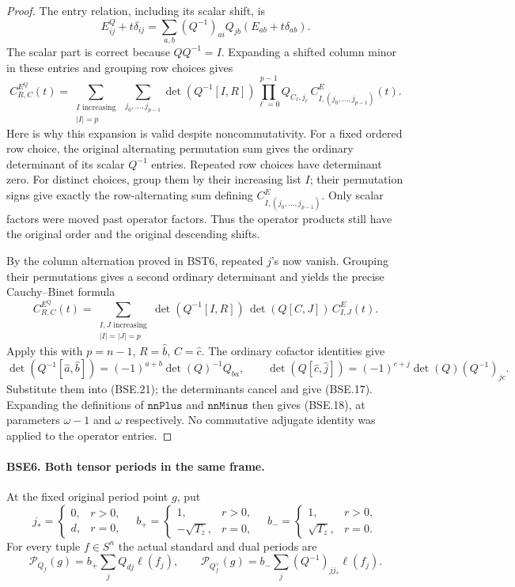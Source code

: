 \begin{proof}
The entry relation, including its scalar shift, is
\[
 E^Q_{ij}+t\delta_{ij}
    =\sum_{a,b}(Q^{-1})_{ai}Q_{jb}
                                      (E_{ab}+t\delta_{ab}).
 \tag{BSE.19}
\]
The scalar part is correct because $QQ^{-1}=I$.
Expanding a shifted column minor in these entries and grouping
row choices gives
\[
 C^{E^Q}_{R,C}(t)
 =\sum_{\substack{I\text{ increasing}\\ |I|=p}}
   \ \sum_{j_0,\ldots,j_{p-1}}
       \det(Q^{-1}[I,R])
       \prod_{\ell=0}^{p-1}Q_{C_\ell,j_\ell}\,
                             C^E_{I,(j_0,\ldots,j_{p-1})}(t).
 \tag{BSE.20}
\]
Here is why this expansion is valid despite noncommutativity.
For a fixed ordered row choice, the original alternating
permutation sum gives the ordinary determinant of its scalar
$Q^{-1}$ entries.  Repeated row choices have determinant zero.
For distinct choices, group them by their increasing list $I$;
their permutation signs give exactly the row-alternating sum
defining $C^E_{I,(j_0,\ldots,j_{p-1})}$.
Only scalar factors were moved past operator factors.
Thus the operator products still have the original order and
the original descending shifts.

By the column alternation proved in BST6, repeated $j$'s now
vanish.  Grouping their permutations gives a second ordinary
determinant and yields the precise Cauchy--Binet formula
\[
 C^{E^Q}_{R,C}(t)
    =\sum_{\substack{I,J\text{ increasing}\\|I|=|J|=p}}
       \det(Q^{-1}[I,R])\,\det(Q[C,J])\,C^E_{I,J}(t).
 \tag{BSE.21}
\]
Apply this with $p=n-1$, $R=\widehat b$, $C=\widehat c$.
The ordinary cofactor identities give
\[
 \det(Q^{-1}[\widehat a,\widehat b])
      =(-1)^{a+b}\det(Q)^{-1}Q_{ba},\qquad
 \det(Q[\widehat c,\widehat j])
      =(-1)^{c+j}\det(Q)(Q^{-1})_{jc}.
 \tag{BSE.22}
\]
Substitute them into (BSE.21); the determinants cancel and give
(BSE.17).  Expanding the definitions of $\texttt{nnPlus}$ and
$\texttt{nnMinus}$ then gives (BSE.18), at parameters
$\omega-1$ and $\omega$ respectively.
No commutative adjugate identity was applied to the operator entries.
\end{proof}

\paragraph{BSE6. Both tensor periods in the same frame.}
\label{claim:BSE6}
At the fixed original period point $g$, put
\[
 j_*=\begin{cases}0,&r>0,\\d,&r=0,\end{cases}
 \quad
 b_+=\begin{cases}1,&r>0,\\-\sqrt{T_z},&r=0,\end{cases}
 \quad
 b_-=\begin{cases}1,&r>0,\\\sqrt{T_z},&r=0.\end{cases}
 \tag{BSE.23}
\]
For every tuple $f\in S^n$ the actual standard and dual periods are
\[
 \mathcal P_{Q_f}(g)=b_+\sum_jQ_{dj}\ell(f_j),\qquad
 \mathcal P_{Q_f^\vee}(g)=b_-\sum_j(Q^{-1})_{jj_*}\ell(f_j).
 \tag{BSE.24}
\]

